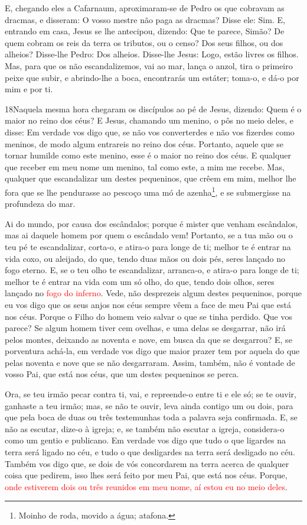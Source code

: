 E, chegando eles a Cafarnaum, aproximaram-se de Pedro os que
cobravam as dracmas, e disseram: O vosso mestre não paga as dracmas?
Disse ele: Sim. E, entrando em casa, Jesus se lhe antecipou,
dizendo: Que te parece, Simão? De quem cobram os reis da terra os
tributos, ou o censo? Dos seus filhos, ou dos alheios?
Disse-lhe Pedro: Dos alheios. Disse-lhe Jesus: Logo, estão
livres os filhos. Mas, para que os não escandalizemos, vai ao
mar, lança o anzol, tira o primeiro peixe que subir, e abrindo-lhe a
boca, encontrarás um estáter; toma-o, e dá-o por mim e por ti.

\medskip

\lettrine{18} Naquela mesma hora chegaram os discípulos ao pé
de Jesus, dizendo: Quem é o maior no reino dos céus? E Jesus,
chamando um menino, o pôs no meio deles, e disse: Em verdade vos
digo que, se não vos converterdes e não vos fizerdes como meninos,
de modo algum entrareis no reino dos céus. Portanto, aquele que
se tornar humilde como este menino, esse é o maior no reino dos
céus. E qualquer que receber em meu nome um menino, tal como
este, a mim me recebe. Mas, qualquer que escandalizar um destes
pequeninos, que crêem em mim, melhor lhe fora que se lhe pendurasse
ao pescoço uma mó de azenha\footnote{Moinho de roda, movido a água;
atafona.}, e se submergisse na profundeza do mar.

Ai do mundo, por causa dos escândalos; porque é mister que venham
escândalos, mas ai daquele homem por quem o escândalo vem!
Portanto, se a tua mão ou o teu pé te escandalizar, corta-o, e
atira-o para longe de ti; melhor te é entrar na vida coxo, ou
aleijado, do que, tendo duas mãos ou dois pés, seres lançado no fogo
eterno. E, se o teu olho te escandalizar, arranca-o, e atira-o
para longe de ti; melhor te é entrar na vida com um só olho, do que,
tendo dois olhos, seres lançado no \textcolor{red}{fogo do inferno}.
Vede, não desprezeis algum destes pequeninos, porque eu vos
digo que os seus anjos nos céus sempre vêem a face de meu Pai que
está nos céus. Porque o Filho do homem veio salvar o que se
tinha perdido. Que vos parece? Se algum homem tiver cem
ovelhas, e uma delas se desgarrar, não irá pelos montes, deixando as
noventa e nove, em busca da que se desgarrou? E, se
porventura achá-la, em verdade vos digo que maior prazer tem por
aquela do que pelas noventa e nove que se não desgarraram.
Assim, também, não é vontade de vosso Pai, que está nos céus,
que um destes pequeninos se perca.

Ora, se teu irmão pecar contra ti, vai, e repreende-o entre ti e
ele só; se te ouvir, ganhaste a teu irmão; mas, se não te
ouvir, leva ainda contigo um ou dois, para que pela boca de duas ou
três testemunhas toda a palavra seja confirmada. E, se não as
escutar, dize-o à igreja; e, se também não escutar a igreja,
considera-o como um gentio e publicano. Em verdade vos digo
que tudo o que ligardes na terra será ligado no céu, e tudo o que
desligardes na terra será desligado no céu. Também vos digo
que, se dois de vós concordarem na terra acerca de qualquer coisa
que pedirem, isso lhes será feito por meu Pai, que está nos céus.
Porque, \textcolor{red}{onde estiverem dois ou três reunidos em meu
nome, aí estou eu no meio deles}.

